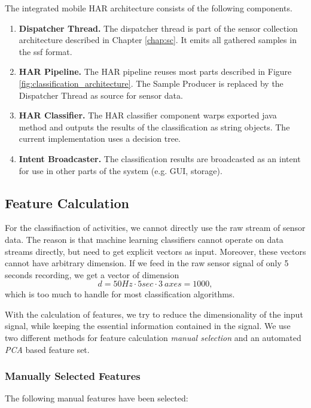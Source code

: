 The integrated mobile HAR architecture consists of the following components.
\begin{enumerate}
\item {\bf Dispatcher Thread.} The dispatcher thread is part of
  the sensor collection architecture described in Chapter
  \ref{chap:sc}. It emits all gathered samples in the ssf format.
\item {\bf HAR Pipeline.} The HAR pipeline reuses most parts described
  in Figure \ref{fig:classification_architecture}. The Sample Producer
  is replaced by the Dispatcher Thread as source for sensor data.
\item {\bf HAR Classifier.} The HAR classifier component warps
  exported java method and outputs the results of the classification
  as string objects. The current implementation uses a decision tree.
\item {\bf Intent Broadcaster.} The classification results are
  broadcasted as an intent for use in other parts of the system
  (e.g. GUI, storage).
\end{enumerate}

\subsection{Feature Calculation}
\label{sec:feature_calc}

For the classifiaction of activities, we cannot directly use the raw
stream of sensor data. The reason is that machine learning classifiers
cannot operate on data streams directly, but need to get explicit
vectors as input. Moreover, these vectors cannot have arbitrary
dimension. If we feed in the raw sensor signal of only 5 seconds
recording, we get a vector of dimension
\[ d = 50 Hz \cdot 5 sec \cdot 3\ axes = 1000, \]
which is too much to handle for most classification algorithms.

With the calculation of features, we try to reduce the dimensionality
of the input signal, while keeping the essential information contained
in the signal. We use two different methods for feature calculation
{\it manual selection} and an automated {\it PCA} based feature set.

\subsubsection*{\bf Manually Selected Features}

The following manual features have been selected:

